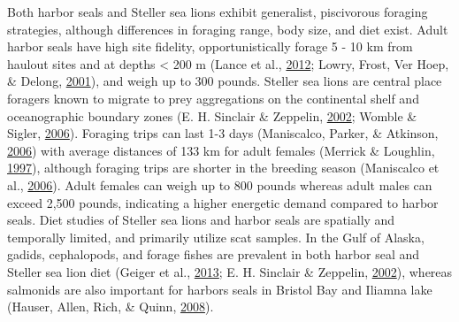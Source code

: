 \documentclass [11pt, proquest] {uwthesis}[2015/03/03]
\begin{document}
Both harbor seals and Steller sea lions exhibit generalist, piscivorous
foraging strategies, although differences in foraging range, body size,
and diet exist. Adult harbor seals have high site fidelity,
opportunistically forage 5 - 10 km from haulout sites and at depths
\textless{} 200 m (Lance et al.,
\protect\hyperlink{ref-Lance2012}{2012}; Lowry, Frost, Ver Hoep, \&
Delong, \protect\hyperlink{ref-Lowry2001}{2001}), and weigh up to 300
pounds. Steller sea lions are central place foragers known to migrate to
prey aggregations on the continental shelf and oceanographic boundary
zones (E. H. Sinclair \& Zeppelin,
\protect\hyperlink{ref-Sinclair2002}{2002}; Womble \& Sigler,
\protect\hyperlink{ref-Womble2006}{2006}). Foraging trips can last 1-3
days (Maniscalco, Parker, \& Atkinson,
\protect\hyperlink{ref-Maniscalco2006}{2006}) with average distances of
133 km for adult females (Merrick \& Loughlin,
\protect\hyperlink{ref-Merrick1997}{1997}), although foraging trips are
shorter in the breeding season (Maniscalco et al.,
\protect\hyperlink{ref-Maniscalco2006}{2006}). Adult females can weigh
up to 800 pounds whereas adult males can exceed 2,500 pounds, indicating
a higher energetic demand compared to harbor seals. Diet studies of
Steller sea lions and harbor seals are spatially and temporally limited,
and primarily utilize scat samples. In the Gulf of Alaska, gadids,
cephalopods, and forage fishes are prevalent in both harbor seal and
Steller sea lion diet (Geiger et al.,
\protect\hyperlink{ref-Geiger2013}{2013}; E. H. Sinclair \& Zeppelin,
\protect\hyperlink{ref-Sinclair2002}{2002}), whereas salmonids are also
important for harbors seals in Bristol Bay and Iliamna lake (Hauser,
Allen, Rich, \& Quinn, \protect\hyperlink{ref-Hauser2008}{2008}).
\end{document}
